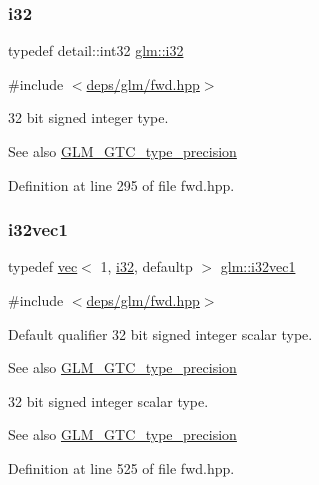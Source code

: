 \subsubsection{\texorpdfstring{i32}{i32}}
{\footnotesize\ttfamily typedef detail\+::int32 \hyperlink{group__gtc__type__precision_ga1d8ed5c43e91ea7d4528389da4fa9524}{glm\+::i32}}



{\ttfamily \#include $<$\hyperlink{fwd_8hpp}{deps/glm/fwd.\+hpp}$>$}

32 bit signed integer type. \begin{DoxySeeAlso}{See also}
\hyperlink{group__gtc__type__precision}{G\+L\+M\+\_\+\+G\+T\+C\+\_\+type\+\_\+precision} 
\end{DoxySeeAlso}


Definition at line 295 of file fwd.\+hpp.

\mbox{\label{group__gtc__type__precision_ga97351dd7f0ede9b8b79943f4adcd6a65}} 
\subsubsection{\texorpdfstring{i32vec1}{i32vec1}}
{\footnotesize\ttfamily typedef \hyperlink{structglm_1_1vec}{vec}$<$ 1, \hyperlink{group__gtc__type__precision_ga1d8ed5c43e91ea7d4528389da4fa9524}{i32}, defaultp $>$ \hyperlink{group__gtc__type__precision_ga97351dd7f0ede9b8b79943f4adcd6a65}{glm\+::i32vec1}}



{\ttfamily \#include $<$\hyperlink{fwd_8hpp}{deps/glm/fwd.\+hpp}$>$}

Default qualifier 32 bit signed integer scalar type. \begin{DoxySeeAlso}{See also}
\hyperlink{group__gtc__type__precision}{G\+L\+M\+\_\+\+G\+T\+C\+\_\+type\+\_\+precision}
\end{DoxySeeAlso}
32 bit signed integer scalar type. \begin{DoxySeeAlso}{See also}
\hyperlink{group__gtc__type__precision}{G\+L\+M\+\_\+\+G\+T\+C\+\_\+type\+\_\+precision} 
\end{DoxySeeAlso}


Definition at line 525 of file fwd.\+hpp.

